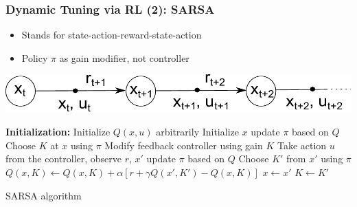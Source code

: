 \documentclass{beamer}
\begin{document}
			\begin{frame}\frametitle{Dynamic Tuning via RL (2): SARSA}
				\vspace{3mm}
				\fontsize{8}{4}\selectfont 
				\begin{itemize}
					\item Stands for state-action-reward-state-action
					\item Policy $\pi$ as gain modifier, not controller
				\end{itemize}
				\begin{center}
					\includegraphics[width=0.50\linewidth]{images/sarsa}
				\end{center}
				\begin{algorithm}[H]
					\begin{algorithmic}[1] 	
						\fontsize{7}{4}\selectfont
						\STATE \textbf{Initialization:} Initialize $ Q(x,u) $ arbitrarily
						\REPEAT %
							\STATE Initialize $ x $ 
							\STATE update $\pi$ based on $ Q $
							\STATE Choose $ K $ at $ x $ using $ \pi $  
							\REPEAT %
								\STATE Modify feedback controller using gain $ K $
								\STATE Take action $ u $ from the controller, observe $ r $, $ x' $ 
								\STATE update $ \pi $ based on $Q$
								\STATE Choose $ K' $ from $ x' $ using $ \pi $ 
								\STATE $ Q(x,K) \leftarrow Q(x,K) + \alpha[r+\gamma Q(x',K')-Q(x,K)] $	
								\STATE $ x \leftarrow  x' $
								\STATE $ K \leftarrow  K' $
					\caption{SARSA algorithm}
					\end{algorithmic}						
				\end{algorithm}
			\end{frame}
			
\end{document}
